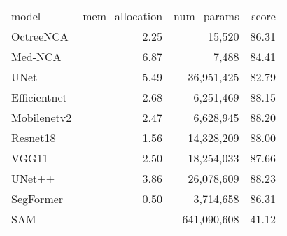 \begin{tabular}{lrrr}
model & mem_allocation & num_params & score \\
OctreeNCA & 2.25 & 15,520 & 86.31 \\
Med-NCA & 6.87 & 7,488 & 84.41 \\
UNet & 5.49 & 36,951,425 & 82.79 \\
Efficientnet & 2.68 & 6,251,469 & 88.15 \\
Mobilenetv2 & 2.47 & 6,628,945 & 88.20 \\
Resnet18 & 1.56 & 14,328,209 & 88.00 \\
VGG11 & 2.50 & 18,254,033 & 87.66 \\
UNet++ & 3.86 & 26,078,609 & 88.23 \\
SegFormer & 0.50 & 3,714,658 & 86.31 \\
SAM & - & 641,090,608 & 41.12 \\
\end{tabular}
